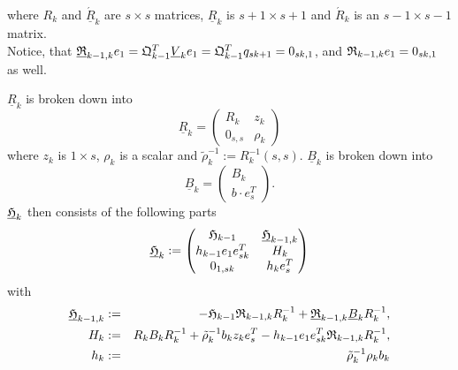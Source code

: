 \documentclass{scrartcl}
\numberwithin{equation}{section}
\begin{document}
where $R_k$ and $\underline{\acute{R}}_k$ are $s \times s$ matrices, $\underline{R}_k$ is $s + 1 \times s + 1$ and $\acute{R}_k$ is an $s - 1 \times s - 1$ matrix.\\
Notice, that $\underline{\frak{R}}_{k - 1, k} e_1 = \frak{Q}^T_{k - 1} \underline{V}_k e_1 = \frak{Q}^T_{k - 1} q_{sk + 1} = 0_{sk, 1}$, and 
$\frak{R}_{k - 1, k} e_1 = 0_{sk, 1}$ as well.

$\underline{R}_k$ is broken down into
\begin{equation*}
\underline{R}_k = 
\begin{pmatrix}
	R_k & z_k\\
	0_{s, s} & \rho_k
\end{pmatrix}
\end{equation*}
where $z_k$ is $1 \times s$, $\rho_k$ is a scalar and $\tilde{\rho}^{-1}_k := R_k^{-1}(s,s)$. $\underline{B}_k$ is broken down into
\begin{equation*}
\underline{B}_k = 
\begin{pmatrix}
	B_k\\
	b \cdot e^T_s
\end{pmatrix}.
\end{equation*}
$\underline{\frak{H}}_k$ then consists of the following parts
\begin{equation}
\underline{\frak{H}}_k : = 
    	\begin{pmatrix}
    		\frak{H}_{k - 1} & \underline{\frak{H}}_{k - 1, k}\\
    		h_{k - 1} e_1 e_{sk}^T & H_k\\
    		0_{1,sk} & h_k e^T_s
    	\end{pmatrix}
\end{equation}
with
\begin{eqnarray} \label{eq:h_blackletter_k_}
\underline{\frak{H}}_{k - 1, k} &:=& -\frak{H}_{k - 1} \frak{R}_{k - 1, k} R^{-1}_k + \underline{\frak{R}}_{k - 1, k} \underline{B}_k R^{-1}_k,\\
H_k &:=& R_k B_k R^{-1}_k + \tilde{\rho}^{-1}_k b_k z_k e^T_s - h_{k-1} e_1 e^T_{sk} \frak{R}_{k-1,k} R^{-1}_k,\\
h_k &:=& \tilde{\rho}^{-1}_k \rho_k b_k
\end{eqnarray}
\end{document}
